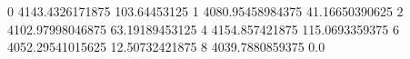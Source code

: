 0 4143.4326171875 103.64453125
1 4080.95458984375 41.16650390625
2 4102.97998046875 63.19189453125
4 4154.857421875 115.0693359375
6 4052.29541015625 12.50732421875
8 4039.7880859375 0.0
